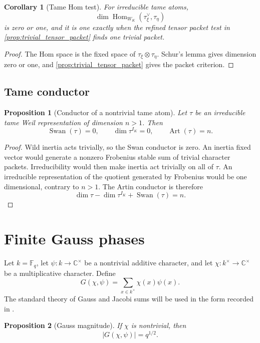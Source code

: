 \documentclass[11pt]{amsart}
\newtheorem{proposition}[proposition]{Proposition}
\newtheorem{corollary}[corollary]{Corollary}
\theoremstyle{definition}
\theoremstyle{remark}
\newcommand{\CC}{\mathbb C}
\newcommand{\FF}{\mathbb F}
\newcommand{\Hom}{\operatorname{Hom}}
\newcommand{\Art}{\operatorname{Art}}
\newcommand{\Swan}{\operatorname{Swan}}
\newcommand{\abs}[1]{\left\lvert#1\right\rvert}
\begin{document}
\begin{corollary}[Tame Hom test]\label{cor:tame_hom}
For irreducible tame atoms,
\[
\dim\Hom_{W_K}(\tau_\xi^\vee,\tau_\eta)
\]
is zero or one, and it is one exactly when the refined tensor packet test in \cref{prop:trivial_tensor_packet} finds one trivial packet.
\end{corollary}

\begin{proof}
The Hom space is the fixed space of \(\tau_\xi\otimes\tau_\eta\). Schur's lemma gives dimension zero or one, and \cref{prop:trivial_tensor_packet} gives the packet criterion.
\end{proof}

\subsection{Tame conductor}

\begin{proposition}[Conductor of a nontrivial tame atom]\label{prop:tame_conductor}
Let \(\tau\) be an irreducible tame Weil representation of dimension \(n>1\). Then
\[
\Swan(\tau)=0,
\qquad
\dim\tau^{I_K}=0,
\qquad
\Art(\tau)=n.
\]
\end{proposition}

\begin{proof}
Wild inertia acts trivially, so the Swan conductor is zero. An inertia fixed vector would generate a nonzero Frobenius stable sum of trivial character packets. Irreducibility would then make inertia act trivially on all of \(\tau\). An irreducible representation of the quotient generated by Frobenius would be one dimensional, contrary to \(n>1\). The Artin conductor is therefore
\[
\dim\tau-\dim\tau^{I_K}+\Swan(\tau)=n.
\]
\end{proof}

\section{Finite Gauss phases}\label{sec:gauss}

Let \(k=\FF_q\), let \(\psi:k\to\CC^{\times}\) be a nontrivial additive character, and let \(\chi:k^{\times}\to\CC^{\times}\) be a multiplicative character. Define
\[
G(\chi,\psi)
=
\sum_{x\in k^{\times}}\chi(x)\psi(x).
\]
The standard theory of Gauss and Jacobi sums will be used in the form recorded in \cite{DavenportHasse1935,BerndtEvansWilliams1998}.

\begin{proposition}[Gauss magnitude]\label{prop:gauss_magnitude}
If \(\chi\) is nontrivial, then
\[
\boxed{
\abs{G(\chi,\psi)}=q^{1/2}.
}
\]
\end{proposition}
\end{document}
